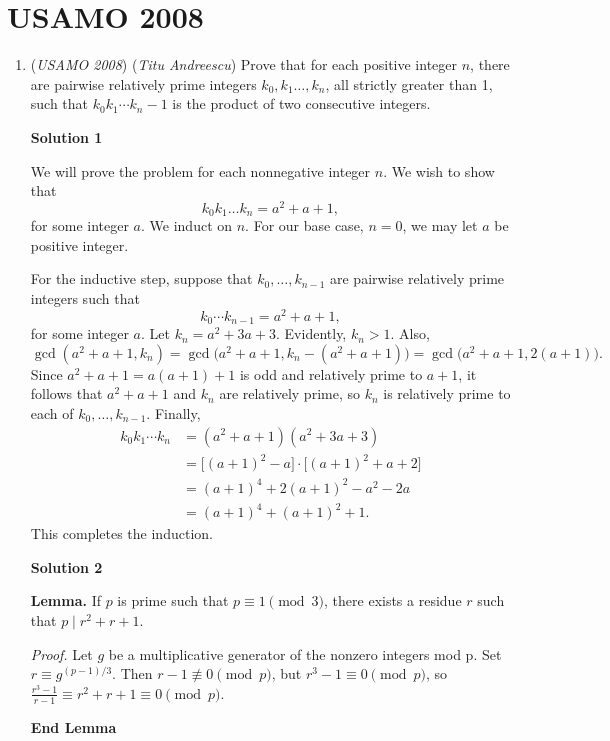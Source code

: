 \section{USAMO 2008}
        \begin{enumerate}
        	\item (\textit{USAMO 2008}) (\textit{Titu Andreescu}) Prove that for each positive integer $n$, there are pairwise relatively prime integers $k_0,k_1\ldots,k_n$, all strictly greater than 1, such that $k_0k_1\cdots k_n-1$ is the product of two consecutive integers.


 



\textbf{Solution 1}

We will prove the problem for each nonnegative integer $n$.  We wish to show that
 \[k_0 k_1 \dotsc k_n = a^2+a+1,\]for some integer $a$.  We induct on $n$.  For our base case, $n=0$, we may let $a$ be positive integer.

 For the inductive step, suppose that $k_0, \dotsc, k_{n-1}$ are pairwise relatively prime integers such that
 \[k_0 \dotsm k_{n-1} = a^2+a+1,\]for some integer $a$.  Let $k_n = a^2 + 3a+3$.  Evidently, $k_n >1$.  Also,
 \[\gcd(a^2+a+1, k_n) = \gcd\bigl(a^2+a+1, k_n - (a^2+a+1) \bigr) = \gcd\bigl(a^2 + a+1, 2(a+1) \bigr) .\]Since $a^2+a+1 = a(a+1)+1$ is odd and relatively prime to $a+1$, it follows that $a^2+a+1$ and $k_n$ are relatively prime, so $k_n$ is relatively prime to each of $k_0, \dotsc, k_{n-1}$.  Finally,
 \begin{align*} k_0 k_1 \dotsm k_n &= (a^2+a+1)(a^2+3a+3)\\ &= \bigl[ (a+1)^2-a \bigr] \cdot \bigl[ (a+1)^2 + a+2 \bigr] \\ &= (a+1)^4 + 2(a+1)^2 - a^2-2a \\ &= (a+1)^4 + (a+1)^2 + 1 . \end{align*}
This completes the induction.  

 



\textbf{Solution 2}

\textbf{Lemma.}  If $p$ is prime such that $p\equiv 1 \pmod{3}$, there exists a residue $r$ such that $p \mid r^2+r+1$.

 \textit{Proof.} Let $g$ be a multiplicative generator of the nonzero integers mod p.  Set $r \equiv g^{(p-1)/3}$.  Then $r-1 \not\equiv 0 \pmod{p}$, but $r^3-1 \equiv 0 \pmod{p}$, so $\frac{r^3-1}{r-1} \equiv r^2 + r+1 \equiv 0 \pmod{p}$. 

 \textbf{End Lemma}


\end{enumerate}
